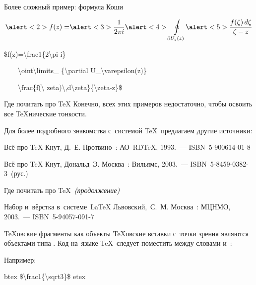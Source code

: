 \begin{frame}{Более сложный пример: формула Коши}
\begin{Huge}
	\[
	\alert<2>{f(z)=}
		\alert<3>{\frac1{2\pi i}}
		\alert<4>{\oint\limits_{\partial U_\varepsilon(z)}}
		\alert<5>{\frac{f(\zeta)\,d\zeta}{\zeta-z}}
	\]
\end{Huge}

\begin{center}
\LARGE
\begin{programlisting}
\$\alert<2>{f(z)=}\alert<3>{\textbackslash frac1\{2\textbackslash pi i\}}\par
~~~~\alert<4>{\textbackslash oint\textbackslash limits\_%
\{\textbackslash partial U\_\textbackslash varepsilon(z)\}}\par
~~~~\alert<5>{\textbackslash frac\{f(\textbackslash
zeta)\textbackslash,d\textbackslash zeta\}\{\textbackslash zeta-z\}}\$\par
\end{programlisting}
\end{center}
\end{frame}

\begin{frame}{Где почитать про \TeX}
Конечно, всех этих примеров недостаточно, чтобы освоить все \TeX{}нические
тонкости.

Для более подробного знакомства с~системой \TeX\ предлагаем другие источники:

\begin{thebibliography}{}
Всё про \TeX
\newblock
Кнут, Д.~Е.
\newblock
Протвино~: АО RD\TeX, 1993.~— ISBN~5-900614-01-8

Всё про \TeX
\newblock
Кнут, Дональд~Э.
\newblock
Москва~: Вильямс, 2003.~— ISBN~5-8459-0382-3~(рус.)
\end{thebibliography}
\end{frame}

\begin{frame}{Где почитать про \TeX\ {\mdseries\itshape(продолжение)}}
\begin{thebibliography}{}
Набор и~вёрстка в~системе \LaTeX
\newblock
Львовский, С. М.
\newblock
Москва~: МЦНМО, 2003.~— ISBN~5-94057-091-7
\end{thebibliography}
\end{frame}

\begin{frame}{\TeX{}овские фрагменты как объекты }
\TeX{}овские вставки с~точки зрения  являются объектами типа
. Код на~языке \TeX\ следует поместить между словами
 и~:
\begin{center}
\Large
{}
\end{center}

Например:
\begin{programlisting}
btex \$\textbackslash frac1\{\textbackslash sqrt3\}\$ etex
\end{programlisting}
\end{frame}

